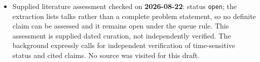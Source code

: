 \documentclass[11pt]{article}
\begin{document}
\begin{itemize}
\item Supplied literature assessment checked on \textbf{2026-08-22}: status \texttt{open}; the extraction lists talks rather than a complete problem statement, so no definite claim can be assessed and it remains open under the queue rule. This assessment is supplied dated curation, not independently verified. The background expressly calls for independent verification of time-sensitive status and cited claims. No source was visited for this draft.
\end{itemize}
\end{document}
